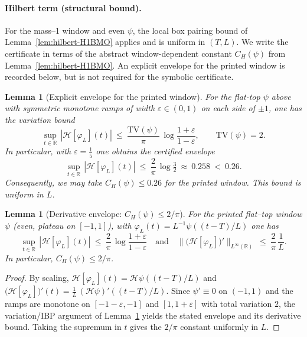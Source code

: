 \documentclass[11pt]{article}
\newtheorem{lemma}[theorem]{Lemma}
\theoremstyle{definition}
\theoremstyle{remark}
\newcommand{\R}{\mathbb{R}}
\begin{document}
\paragraph{Hilbert term (structural bound).}
For the mass--1 window and even \(\psi\), the local box pairing bound of Lemma~\ref{lem:hilbert-H1BMO} applies and is uniform in \((T,L)\). We write the certificate in terms of the abstract window-dependent constant \(C_H(\psi)\) from Lemma~\ref{lem:hilbert-H1BMO}. An explicit envelope for the printed window is recorded below, but is not required for the symbolic certificate.
\begin{lemma}[Explicit envelope for the printed window]\label{lem:CH-explicit}
For the flat-top \(\psi\) above with symmetric monotone ramps of width \(\varepsilon\in(0,1)\) on each side of \(\pm1\), one has the variation bound
\[
  \sup_{t\in\R}\,|\mathcal H[\varphi_L](t)|\ \le\ \frac{\mathrm{TV}(\psi)}{\pi}\,\log\frac{1+\varepsilon}{1-\varepsilon},\qquad \mathrm{TV}(\psi)=2.
\]
In particular, with \(\varepsilon=\tfrac15\) one obtains the certified envelope
\[
  \sup_{t\in\R}\,|\mathcal H[\varphi_L](t)|\ \le\ \frac{2}{\pi}\,\log\tfrac{3}{2}\ \approx\ 0.258\ <\ 0.26.
\]
Consequently, we may take \(C_H(\psi)\le 0.26\) for the printed window. This bound is uniform in \(L\).
\end{lemma}
\begin{lemma}[Derivative envelope: $C_H(\psi)\le 2/\pi$]\label{lem:CH-derivative-2pi}
For the printed flat–top window \(\psi\) (even, plateau on $[-1,1]$), with \(\varphi_L(t)=L^{-1}\psi((t-T)/L)\) one has
\[ \sup_{t\in\R}\,|\mathcal H[\varphi_L](t)|\ \le\ \frac{2}{\pi}\,\log\frac{1+\varepsilon}{1-\varepsilon}\quad\text{and}\quad \big\|\big(\mathcal H[\varphi_L]\big)'\big\|_{L^\infty(\R)}\ \le\ \frac{2}{\pi}\,\frac{1}{L}. \]
In particular, $C_H(\psi)\le 2/\pi$.
\end{lemma}
\begin{proof}
By scaling, \(\mathcal H[\varphi_L](t)=\mathcal H\psi((t-T)/L)\) and \(\big(\mathcal H[\varphi_L]\big)'(t)=\tfrac{1}{L}\,(\mathcal H\psi)'((t-T)/L)\). Since \(\psi'\equiv 0\) on \((-1,1)\) and the ramps are monotone on \([-1-\varepsilon,-1]\) and \([1,1+\varepsilon]\) with total variation \(2\), the variation/IBP argument of Lemma~\ref{lem:CH-explicit} yields the stated envelope and its derivative bound. Taking the supremum in \(t\) gives the \(2/\pi\) constant uniformly in \(L\).
\end{proof}
\end{document}
